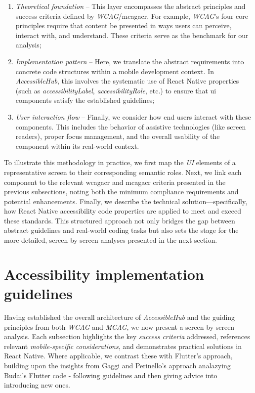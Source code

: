 \begin{enumerate}
    \item \textit{Theoretical foundation} – This layer encompasses the abstract principles and success criteria defined by \textit{WCAG}/\acrshort{mcagacr}. For example, \textit{WCAG}’s four core principles require that content be presented in ways users can perceive, interact with, and understand. These criteria serve as the benchmark for our analysis;

    \item \textit{Implementation pattern} – Here, we translate the abstract requirements into concrete code structures within a mobile development context. In \textit{AccessibleHub}, this involves the systematic use of React Native properties (such as \textit{accessibilityLabel}, \textit{accessibilityRole}, etc.) to ensure that \acrshort{ui} components satisfy the established guidelines;

    \item \textit{User interaction flow} – Finally, we consider how end users interact with these components. This includes the behavior of assistive technologies (like screen readers), proper focus management, and the overall usability of the component within its real-world context.
\end{enumerate}

To illustrate this methodology in practice, we first map the \textit{UI} elements of a representative screen to their corresponding semantic roles. Next, we link each component to the relevant \acrshort{wcagacr} and \acrshort{mcagacr} criteria presented in the previous subsections, noting both the minimum compliance requirements and potential enhancements. Finally, we describe the technical solution—specifically, how React Native accessibility code properties are applied to meet and exceed these standards. This structured approach not only bridges the gap between abstract guidelines and real-world coding tasks but also sets the stage for the more detailed, screen-by-screen analyses presented in the next section.

\section{Accessibility implementation guidelines}
\label{sec:implementation-guidelines}

Having established the overall architecture of \textit{AccessibleHub} and the guiding principles from both \textit{WCAG} and \textit{MCAG}, we now present a screen-by-screen analysis. Each subsection highlights the key \textit{success criteria} addressed, references relevant \textit{mobile-specific considerations}, and demonstrates practical solutions in React Native. Where applicable, we contrast these with Flutter's approach, building upon the insights from Gaggi and Perinello's approach \cite{budai2024mobile} analazying Budai's Flutter code - following guidelines and then giving advice into introducing new ones.


